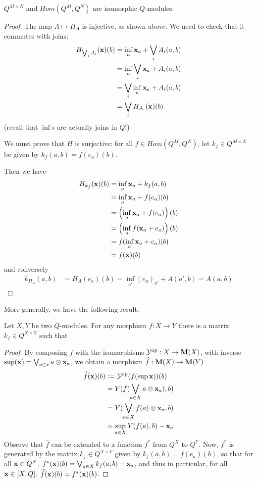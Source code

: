 \begin{proposition}
$Q^{M\times N}$ and $Hom(Q^{M},Q^{N})$ are isomorphic $Q$-modules.
\end{proposition}
\begin{proof}
The map $A\mapsto H_{A}$ is injective, as shown above. We need to check that it commutes with joins:
\begin{align*}
H_{\bigvee_{i}A_{i}}(\mathbf{x})(b) & = \inf_{a}\mathbf{x}_{a}+\bigvee_{i}A_{i}(a,b)\\
&=  \inf_{a}\bigvee_{i}\mathbf{x}_{a}+A_{i}(a,b)\\
&=  \bigvee_{i}\inf_{a}\mathbf{x}_{a}+A_{i}(a,b)\\
&=  \bigvee_{i}H_{A_{i}}(\mathbf{x})(b)\end{align*} 
(recall that $\inf$s are actually joins in $Q$!)

We must prove that $H$ is surjective: for all $f\in Hom(Q^{M},Q^{N})$, let 
$k_{f}\in Q^{M\times N}$ be given by $k_{f}(a,b)=f(e_{a})(b)$. 

Then we have 
\begin{align*}
H_{k_{f}}(\mathbf{x})(b) & = \inf_{a}\mathbf{x}_{a}+k_{f}(a,b) \\
&= \inf_{a}\mathbf{x}_{a}+ f(e_{a})(b)\\
&= \left(\inf_{a}\mathbf{x}_{a}+f(e_{a})\right)(b) \\
&= \left(\inf_{a}f(\mathbf{x}_{a}+e_{a})\right)(b) \\
&= f(\inf_{a}\mathbf{x}_{a}+e_{a})(b)\\
&=
f(\mathbf{x})(b)
\end{align*}
and conversely 
\begin{align*}
k_{H_{A}}(a,b)&= H_{A}(e_{a})(b)= \inf_{a'}(e_{a})_{a'}+A(a',b) =  A(a,b)
\end{align*}
\end{proof}


More generally, we have the following result:
\begin{proposition}
Let $X,Y$ be two $Q$-modules. For any morphism $f: X\to Y$ there is a matrix $k_{f}\in Q^{X\times Y}$ such that 

\end{proposition}
\begin{proof}
By composing $f$ with the isomorphisms $\mathcal{Y}^{\mathrm{op}}:X\to \mathbf{M}(X)$, with inverse $\sup(\mathbf{x})=\bigvee_{a\in x}a\otimes \mathbf{x}_{a}$, we obtain 
a morphism $\widehat f: \mathbf{M}(X)\to \mathbf{M}(Y)$  
\begin{align*}
\widehat f(\mathbf{x})(b)&:= \mathcal{Y}^{\mathrm{op}}(f(\sup \mathbf{x}))(b) \\
&= Y( f(\bigvee_{a\in X}a\otimes \mathbf{x}_{a}),b) \\
&= Y( \bigvee_{a\in X}f(a)\otimes \mathbf{x}_{a},b) \\
&= \sup_{a\in X}Y(f(a),b)-\mathbf{x}_{a}
\end{align*}
Observe that $\widehat f$ can be extended to a function $f^{*}$ from $Q^{X}$ to $Q^{Y}$.
Now, $ f^{*}$ is generated by the matrix $k_{f}\in Q^{X\times Y}$ given by $k_{ f}(a,b)=f(e_{a})(b)$, so that for all $\mathbf{x}\in Q^{X}$, 
$f^{*}(\mathbf{x})(b)=\bigvee_{a\in X}k_{f}(a,b)+\mathbf{x}_{a}$, and thus
in particular, for all $\mathbf{x}\in [X,Q]$, 
$\widehat f(\mathbf{x})(b)=f^{*}(\mathbf{x})(b)$.
\end{proof}

